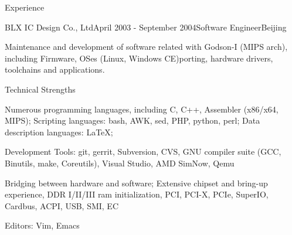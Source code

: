 \documentclass{resume} %
\begin{document}
\begin{rSection}{Experience}



\begin{rSubsection}{BLX IC Design Co., Ltd}{April 2003 - September 2004}{Software Engineer}{Beijing}
\item Maintenance and development of software related with Godson-I (MIPS arch), including Firmware, OSes
         (Linux, Windows CE)porting, hardware drivers, toolchains and applications.
\item 
\end{rSubsection}


\end{rSection}


\begin{rSection}{Technical Strengths}

\item Numerous programming languages, including C, C++, Assembler (x86/x64,
MIPS); Scripting languages: bash, AWK, sed, PHP, python, perl; Data description languages: LaTeX;

\item Development Tools: git, gerrit, Subversion, CVS,
GNU compiler suite (GCC, Binutils, make, Coreutils), Visual Studio, AMD SimNow, Qemu

\item Bridging between hardware and software; Extensive chipset and bring-up
experience, DDR I/II/III ram initialization, PCI, PCI-X, PCIe, SuperIO, Cardbus, ACPI, USB,
SMI, EC

\item Editors: Vim, Emacs

\end{rSection}
\end{document}
